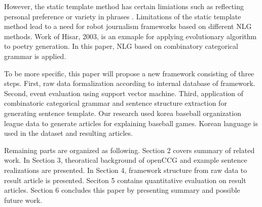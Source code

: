 \documentclass[11pt,letterpaper]{article}
\begin{document}
However, the static template method has certain limiations such as reflecting personal preference or variety in phrases \cite{Donghwan2015}. Limitations of the static template method lead to a need for robot journalism frameworks based on different NLG methods. Work of Hisar, 2003, is an exmaple for applying evolutionary algorithm to poetry generation. In this paper, NLG based on combinatory categorical grammar is applied. 

To be more specific, this paper will propose a new framework consisting of three steps. First, raw data formalization according to internal database of framework. Second, event evaluation using support vector machine. Third, application of combinatoric categorical grammar and sentence structure extraction for generating sentence template. Our research used korea baseball organization league data to generate articles for explaining baseball games. Korean language is used in the dataset and resulting articles. 

Remaining parts are organized as following. Section 2 covers summary of related work. In Section 3, theoratical background of openCCG and example sentence realizations are presented. In Section 4, framework structure from raw data to result article is presented. Seciton 5 contains quantitative evaluation on result articles. Section 6 concludes this paper by presenting summary and possible future work.  

\end{document}
